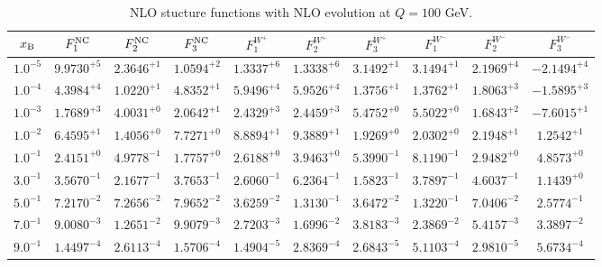 \begin{table}[h]
\begin{adjustbox}{width=\textwidth}
\begin{tabular}{|c||c|c|c|c|c|c|c|c|c|}
\hline
$x_{\rm B}$ & $F_1^{\rm NC}$ & $F_2^{\rm NC}$ & $F_3^{\rm NC}$ & $F_1^{W^+}$ & $F_2^{W^+}$ & $F_3^{W^+}$ & $F_1^{W^-}$ & $F_2^{W^-}$ & $F_3^{W^-}$ \\
\hline
$ 1.0^{-5}$ & $ 9.9730^{+5}$ & $ 2.3646^{+1}$ & $ 1.0594^{+2}$ & $ 1.3337^{+6}$ & $ 1.3338^{+6}$ & $ 3.1492^{+1}$ & $ 3.1494^{+1}$ & $ 2.1969^{+4}$ & $-2.1494^{+4}$ \\
$ 1.0^{-4}$ & $ 4.3984^{+4}$ & $ 1.0220^{+1}$ & $ 4.8352^{+1}$ & $ 5.9496^{+4}$ & $ 5.9526^{+4}$ & $ 1.3756^{+1}$ & $ 1.3762^{+1}$ & $ 1.8063^{+3}$ & $-1.5895^{+3}$ \\
$ 1.0^{-3}$ & $ 1.7689^{+3}$ & $ 4.0031^{+0}$ & $ 2.0642^{+1}$ & $ 2.4329^{+3}$ & $ 2.4459^{+3}$ & $ 5.4752^{+0}$ & $ 5.5022^{+0}$ & $ 1.6843^{+2}$ & $-7.6015^{+1}$ \\
$ 1.0^{-2}$ & $ 6.4595^{+1}$ & $ 1.4056^{+0}$ & $ 7.7271^{+0}$ & $ 8.8894^{+1}$ & $ 9.3889^{+1}$ & $ 1.9269^{+0}$ & $ 2.0302^{+0}$ & $ 2.1948^{+1}$ & $ 1.2542^{+1}$ \\
$ 1.0^{-1}$ & $ 2.4151^{+0}$ & $ 4.9778^{-1}$ & $ 1.7757^{+0}$ & $ 2.6188^{+0}$ & $ 3.9463^{+0}$ & $ 5.3990^{-1}$ & $ 8.1190^{-1}$ & $ 2.9482^{+0}$ & $ 4.8573^{+0}$ \\
$ 3.0^{-1}$ & $ 3.5670^{-1}$ & $ 2.1677^{-1}$ & $ 3.7653^{-1}$ & $ 2.6060^{-1}$ & $ 6.2364^{-1}$ & $ 1.5823^{-1}$ & $ 3.7897^{-1}$ & $ 4.6037^{-1}$ & $ 1.1439^{+0}$ \\
$ 5.0^{-1}$ & $ 7.2170^{-2}$ & $ 7.2656^{-2}$ & $ 7.9652^{-2}$ & $ 3.6259^{-2}$ & $ 1.3130^{-1}$ & $ 3.6472^{-2}$ & $ 1.3220^{-1}$ & $ 7.0406^{-2}$ & $ 2.5774^{-1}$ \\
$ 7.0^{-1}$ & $ 9.0080^{-3}$ & $ 1.2651^{-2}$ & $ 9.9079^{-3}$ & $ 2.7203^{-3}$ & $ 1.6996^{-2}$ & $ 3.8183^{-3}$ & $ 2.3869^{-2}$ & $ 5.4157^{-3}$ & $ 3.3897^{-2}$ \\
$ 9.0^{-1}$ & $ 1.4497^{-4}$ & $ 2.6113^{-4}$ & $ 1.5706^{-4}$ & $ 1.4904^{-5}$ & $ 2.8369^{-4}$ & $ 2.6843^{-5}$ & $ 5.1103^{-4}$ & $ 2.9810^{-5}$ & $ 5.6734^{-4}$ \\
\hline
\end{tabular}
\end{adjustbox}\caption{NLO stucture functions with NLO evolution at $Q = 100$ GeV.}
\label{tab:N1LO-Q100}
\end{table}


